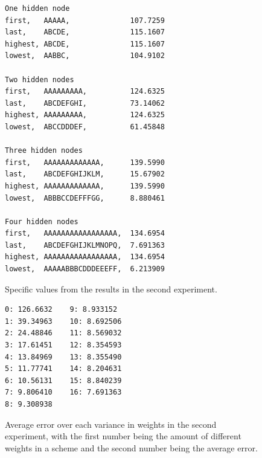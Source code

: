 \documentclass[a4paper, 10pt, notitlepage, twocolumn]{article}
\begin{document}
  \begin{figure}[h!]
  	\begin{verbatim}
One hidden node
first,   AAAAA,              107.7259
last,    ABCDE,              115.1607
highest, ABCDE,              115.1607
lowest,  AABBC,              104.9102

Two hidden nodes
first,   AAAAAAAAA,          124.6325
last,    ABCDEFGHI,          73.14062
highest, AAAAAAAAA,          124.6325
lowest,  ABCCDDDEF,          61.45848

Three hidden nodes
first,   AAAAAAAAAAAAA,      139.5990
last,    ABCDEFGHIJKLM,      15.67902
highest, AAAAAAAAAAAAA,      139.5990
lowest,  ABBBCCDEFFFGG,      8.880461

Four hidden nodes
first,   AAAAAAAAAAAAAAAAA,  134.6954
last,    ABCDEFGHIJKLMNOPQ,  7.691363
highest, AAAAAAAAAAAAAAAAA,  134.6954
lowest,  AAAAABBBCDDDEEEFF,  6.213909
  	\end{verbatim}
  	\caption{Specific values from the results in the second experiment.}
  	\label{firstlastreverse}
  \end{figure}
  
  \begin{figure}[h!]
  	\begin{verbatim}
0: 126.6632    9: 8.933152
1: 39.34963    10: 8.692506
2: 24.48846    11: 8.569032
3: 17.61451    12: 8.354593
4: 13.84969    13: 8.355490
5: 11.77741    14: 8.204631
6: 10.56131    15: 8.840239
7: 9.806410    16: 7.691363
8: 9.308938
  	\end{verbatim}
  	\caption{Average error over each variance in weights in the second experiment, with the first number being the amount of different weights in a scheme and the second number being the average error.}
  	\label{variancereverse}
  \end{figure}
  
\end{document}
